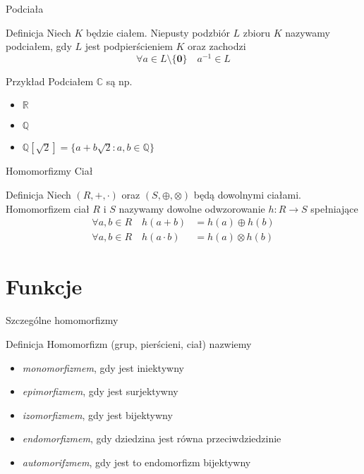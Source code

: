 \documentclass{beamer}
\newcommand{\zero}{\mathbf{0}}
\begin{document}
\begin{frame}{Podciała}
    \begin{block}{Definicja}
        Niech $K$ będzie ciałem. Niepusty podzbiór $L$ zbioru $K$ nazywamy podciałem, gdy $L$ jest podpierścieniem $K$ oraz zachodzi
        $$\forall a \in L\setminus \{\zero\} \quad a^{-1} \in L$$
    \end{block}
    \begin{exampleblock}{Przykład}
        Podciałem $\mathbb{C}$ są np.
        \begin{itemize}
            \item $\mathbb{R}$
            \item $\mathbb{Q}$
            \item $\mathbb{Q}[\sqrt{2}] = \{ a + b\sqrt{2} : a,b \in \mathbb{Q} \}$
        \end{itemize}
    \end{exampleblock}
\end{frame}

\begin{frame}{Homomorfizmy Ciał}
    \begin{block}{Definicja}
        Niech $(R, + , \cdot)$ oraz $(S, \oplus, \otimes)$ będą dowolnymi ciałami. Homomorfizem ciał $R$ i $S$ nazywamy dowolne odwzorowanie $h : R \rightarrow S$ spełniające 
        \begin{align*}
            \forall a,b \in R \quad h(a + b) & = h(a) \oplus h(b) \\
            \forall a,b \in R \quad h(a \cdot b) & = h(a) \otimes h(b) 
        \end{align*}
    \end{block}
\end{frame}
\section{Funkcje}

\begin{frame}{Szczególne homomorfizmy}
    \begin{block}{Definicja}
        Homomorfizm (grup, pierścieni, ciał) nazwiemy 
        \begin{itemize}
            \item \textit{monomorfizmem}, gdy jest iniektywny
            \item \textit{epimorfizmem}, gdy jest surjektywny
            \item \textit{izomorfizmem}, gdy jest bijektywny
            \item \textit{endomorfizmem}, gdy dziedzina jest równa przeciwdziedzinie
            \item \textit{automorifzmem}, gdy jest to endomorfizm bijektywny 
        \end{itemize}
    \end{block}
\end{frame}
\end{document}
